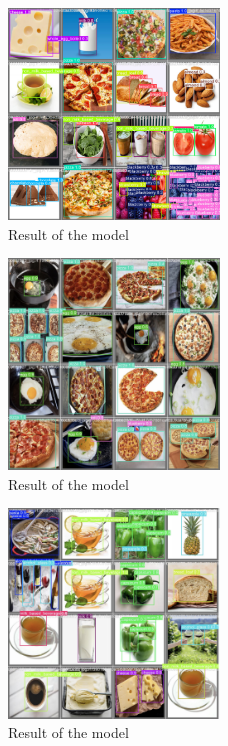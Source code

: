 \documentclass[10pt,twocolumn,letterpaper]{article}
\begin{document}
\begin{figure}[htbp]
    \centering
    \includegraphics[width=0.5\textwidth]{detection-result-1.png}
    \caption{Result of the model}\label{complete-detection-result-1}
\end{figure}
\begin{figure}[htbp]
    \centering
    \includegraphics[width=0.5\textwidth]{detection-result-2.png}
    \caption{Result of the model}\label{complete-detection-result-2}
\end{figure}
\begin{figure}[htbp]
    \centering
    \includegraphics[width=0.5\textwidth]{detection-result-3.png}
    \caption{Result of the model}\label{complete-detection-result-3}
\end{figure}
\end{document}
